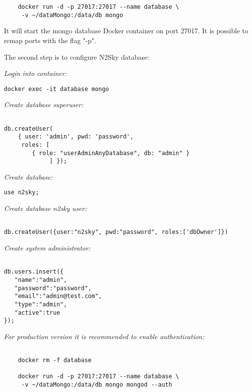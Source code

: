  \begin{lstlisting}
	docker run -d -p 27017:27017 --name database \
	 -v ~/dataMongo:/data/db mongo
\end{lstlisting}

It will start the mongo database Docker container on port 27017. 
It is possible to remap ports with the flag "-p".

The second step is to configure N2Sky database:

\emph{Login into container:}  
 \begin{lstlisting}
docker exec -it database mongo
\end{lstlisting}

\emph{Create database superuser:}
 \begin{lstlisting}
 
db.createUser(
	{ user: 'admin', pwd: 'password',
	 roles: [
	 	{ role: "userAdminAnyDatabase", db: "admin" }
			 ] });

\end{lstlisting}



\emph{Create database:}
 \begin{lstlisting}
use n2sky;
\end{lstlisting}


\emph{Create database n2sky user:}
 \begin{lstlisting}
 
db.createUser({user:"n2sky", pwd:"password", roles:['dbOwner']})

\end{lstlisting}

\emph{Create system administrator:}
 \begin{lstlisting}
 
db.users.insert({
   "name":"admin",
   "password":"password",
   "email":"admin@test.com",
   "type":"admin",
   "active":true
});

\end{lstlisting}


\emph{For production version it is recommended to enable authentication:}
 \begin{lstlisting}
 
 	docker rm -f database
 
	docker run -d -p 27017:27017 --name database \
	 -v ~/dataMongo:/data/db mongo mongod --auth

\end{lstlisting}



